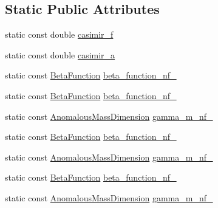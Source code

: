 \subsection*{Static Public Attributes}
\begin{DoxyCompactItemize}
\item 
static const double \hyperlink{classeos_1_1QCD_a05f7ff1fada6145efece3310cde56e5a}{casimir\_\-f}
\item 
static const double \hyperlink{classeos_1_1QCD_ab74e057f2d2b9a05e3c8cbdbce9a2413}{casimir\_\-a}
\end{DoxyCompactItemize}
\begin{Indent}{\bf }\par
{\em \label{_amgrpd41d8cd98f00b204e9800998ecf8427e}
 }\begin{DoxyCompactItemize}
\item 
static const \hyperlink{classeos_1_1QCD_a1261bb4643fea3012beb0a9ea78b7dea}{BetaFunction} \hyperlink{classeos_1_1QCD_abc5015326a2e2c0544aa5d2a392b7ea1}{beta\_\-function\_\-nf\_}
\item 
static const \hyperlink{classeos_1_1QCD_a1261bb4643fea3012beb0a9ea78b7dea}{BetaFunction} \hyperlink{classeos_1_1QCD_a5022dbb4487a457142d0d04d18494d88}{beta\_\-function\_\-nf\_}
\item 
static const \hyperlink{classeos_1_1QCD_a3ca5eea2df0bd5c0043071e14c58d089}{AnomalousMassDimension} \hyperlink{classeos_1_1QCD_a121e70974f149e6303ec5cc0be5cec35}{gamma\_\-m\_\-nf\_}
\item 
static const \hyperlink{classeos_1_1QCD_a1261bb4643fea3012beb0a9ea78b7dea}{BetaFunction} \hyperlink{classeos_1_1QCD_a142158984dbb9ebc03f970d1dc3189c2}{beta\_\-function\_\-nf\_}
\item 
static const \hyperlink{classeos_1_1QCD_a3ca5eea2df0bd5c0043071e14c58d089}{AnomalousMassDimension} \hyperlink{classeos_1_1QCD_a2c39e24c316de9bceb7df4b6cce05665}{gamma\_\-m\_\-nf\_}
\item 
static const \hyperlink{classeos_1_1QCD_a1261bb4643fea3012beb0a9ea78b7dea}{BetaFunction} \hyperlink{classeos_1_1QCD_ae21fca3bee658d5b53bc12af43fa8fc2}{beta\_\-function\_\-nf\_}
\item 
static const \hyperlink{classeos_1_1QCD_a3ca5eea2df0bd5c0043071e14c58d089}{AnomalousMassDimension} \hyperlink{classeos_1_1QCD_a1732d2faffdb5712fbb5e53f521bdb4f}{gamma\_\-m\_\-nf\_}
\end{DoxyCompactItemize}
\end{Indent}


